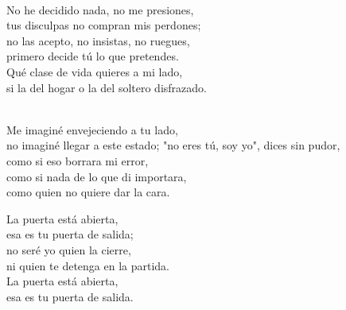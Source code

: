 \begin{lyrics}
\\
No he decidido nada, no me presiones,\\
tus disculpas no compran mis perdones;\\
no las acepto, no insistas, no ruegues,\\
primero decide tú lo que pretendes.\\
Qué clase de vida quieres a mi lado,\\
si la del hogar o la del soltero disfrazado.

\\
Me imaginé envejeciendo a tu lado,\\
no imaginé llegar a este estado;
"no eres tú, soy yo", dices sin pudor,\\
como si eso borrara mi error,\\
como si nada de lo que di importara,\\
como quien no quiere dar la cara.

La puerta está abierta,\\
esa es tu puerta de salida;\\
no seré yo quien la cierre,\\
ni quien te detenga en la partida.\\
La puerta está abierta,\\
esa es tu puerta de salida.
\end{lyrics}

